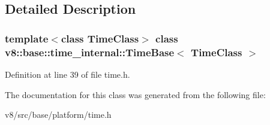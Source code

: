 \subsection{Detailed Description}
\subsubsection*{template$<$class Time\+Class$>$\newline
class v8\+::base\+::time\+\_\+internal\+::\+Time\+Base$<$ Time\+Class $>$}



Definition at line 39 of file time.\+h.



The documentation for this class was generated from the following file\+:\begin{DoxyCompactItemize}
\item 
v8/src/base/platform/time.\+h\end{DoxyCompactItemize}

